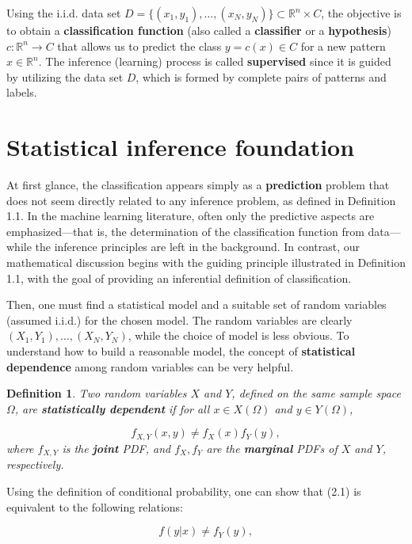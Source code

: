 \documentclass{report}
\newtheorem{definition}{Definition}[chapter]
\begin{document}
Using the i.i.d. data set $D = \{(x_1,y_1),\dots,(x_N,y_N)\} \subset \mathbb{R}^n \times C$, the objective is to obtain a \textbf{classification function} (also called a \textbf{classifier} or a \textbf{hypothesis}) $c : \mathbb{R}^n \to C$ that allows us to predict the class $y = c(x) \in C$ for a new pattern $x \in \mathbb{R}^n$. The inference (learning) process is called \textbf{supervised} since it is guided by utilizing the data set $D$, which is formed by complete pairs of patterns and labels.

\section{Statistical inference foundation}
At first glance, the classification appears simply as a \textbf{prediction} problem that does not seem directly related to any inference problem, as defined in Definition 1.1. In the machine learning literature, often only the predictive aspects are emphasized—that is, the determination of the classification function from data—while the inference principles are left in the background. In contrast, our mathematical discussion begins with the guiding principle illustrated in Definition 1.1, with the goal of providing an inferential definition of classification.

Then, one must find a statistical model and a suitable set of random variables (assumed i.i.d.) for the chosen model. The random variables are clearly $(X_1,Y_1),\dots,(X_N,Y_N)$, while the choice of model is less obvious. To understand how to build a reasonable model, the concept of \textbf{statistical dependence} among random variables can be very helpful.

\begin{definition}
Two random variables $X$ and $Y$, defined on the same sample space $\Omega$, are \textbf{statistically dependent} if for all $x\in X(\Omega)$ and $y \in Y(\Omega)$,

\begin{equation}
f_{X,Y}(x,y) \neq f_X(x)f_Y(y),
\end{equation}
where $f_{X,Y}$ is the \textbf{joint} PDF, and $f_X,f_Y$ are the \textbf{marginal} PDFs of $X$ and $Y$, respectively.
\end{definition}
Using the definition of conditional probability, one can show that (2.1) is equivalent to the following relations:

\begin{equation}
f(y|x) \neq f_Y(y),
\end{equation}
\end{document}

